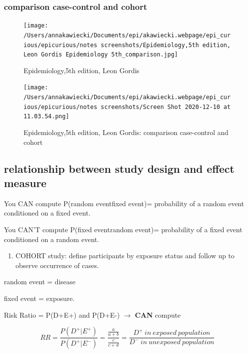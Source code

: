 \documentclass[
]{article}
\providecommand{\tightlist}{%
  \setlength{\itemsep}{0pt}\setlength{\parskip}{0pt}}
\begin{document}
\hypertarget{comparison-case-control-and-cohort}{%
\subsubsection{\texorpdfstring{\textbf{comparison case-control and
cohort}}{comparison case-control and cohort}}\label{comparison-case-control-and-cohort}}

\begin{figure}
\centering
\texttt{[image: /Users/annakawiecki/Documents/epi/akawiecki.webpage/epi\_curious/epicurious/notes screenshots/Epidemiology,5th edition, Leon Gordis Epidemiology 5th\_comparison.jpg]}
\caption{Epidemiology,5th edition, Leon Gordis}
\end{figure}

\begin{figure}
\centering
\texttt{[image: /Users/annakawiecki/Documents/epi/akawiecki.webpage/epi\_curious/epicurious/notes screenshots/Screen Shot 2020-12-10 at 11.03.54.png]}
\caption{Epidemiology,5th edition, Leon Gordis: comparison case-control
and cohort}
\end{figure}

\hypertarget{relationship-between-study-design-and-effect-measure}{%
\subsection{\texorpdfstring{\textbf{relationship between study design
and effect
measure}}{relationship between study design and effect measure}}\label{relationship-between-study-design-and-effect-measure}}

You CAN compute P(random event\textbar fixed event)= probability of a
random event conditioned on a fixed event.

You CAN'T compute P(fixed event\textbar random event)= probability of a
fixed event conditioned on a random event.

\begin{enumerate}
\def\labelenumi{\arabic{enumi}.}
\tightlist
\item
  COHORT study: define participants by exposure status and follow up to
  observe occurrence of cases.
\end{enumerate}

random event = disease

fixed event = exposure.

Risk Ratio = P(D+\textbar E+) and P(D+\textbar E-) \(\to\) \textbf{CAN}
compute

\[RR= \frac{P(D^+|E^+)}{P(D^+|E^-)}=\frac{\frac{a}{a+b}}{\frac{c}{c+d}}=\frac{D^+\:in\:exposed\:population}{D^-\:in\:unexposed\:population}\]
\end{document}
